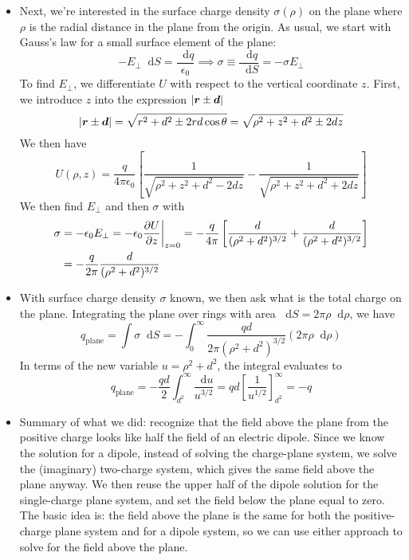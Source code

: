 \documentclass[11pt, a4paper]{article}
\newcommand{\diff}{\mathop{}\!\mathrm{d}} %
\renewcommand{\vec}[1]{\bm{#1}} %
\renewcommand{\r}{\vec{r}}
\newcommand{\ee}{\epsilon_{0}}  %
\begin{document}
\begin{itemize}
	\item Next, we're interested in the surface charge density $ \sigma(\rho) $ on the plane where $ \rho $ is the radial distance in the plane from the origin. As usual, we start with Gauss's law for a small surface element of the plane: 
	\begin{equation*}
		-E_{\perp}\diff S = \frac{\diff q}{\ee} \implies \sigma \equiv \frac{\diff q}{\diff S} =  -\sigma E_{\perp}
	\end{equation*}
	To find $ E_{\perp} $, we differentiate $ U $ with respect to the vertical coordinate $ z $. First, we introduce $ z $ into the expression $ \abs{\r \pm \vec{d}} $
	\begin{equation*}
		\abs{\r \pm \vec{d}} = \sqrt{r^{2}+d^{2} \pm 2rd\cos \theta} = \sqrt{\rho^{2} + z^{2} + d^{2} \pm 2dz}
	\end{equation*}
	We then have
	\begin{equation*}
		U(\rho, z) = \frac{q}{4\pi \ee}\left[\frac{1}{\sqrt{\rho^{2} + z^{2} + d^{2} - 2dz}} - \frac{1}{\sqrt{\rho^{2} + z^{2} + d^{2} + 2dz}}\right]
	\end{equation*}
	We then find $ E_{\perp} $ and then $ \sigma $ with
	\begin{align*}
		\sigma &= - \ee E_{\perp} = -\ee \pdv{U}{z}\bigg|_{z=0} = -\frac{q}{4\pi}\left[\frac{d}{(\rho^{2}+d^{2})^{3/2}} +  \frac{d}{(\rho^{2}+d^{2})^{3/2}} \right]\\
		& = -\frac{q}{2\pi} \frac{d}{(\rho^{2}+d^{2})^{3/2}}
	\end{align*}
	
	\item With surface charge density $ \sigma $ known, we then ask what is the total charge on the plane. Integrating the plane over rings with area $ \diff S = 2\pi \rho \diff \rho $, we have
	\begin{equation*}
		q_{\text{plane}} = \int \sigma \diff S = - \int_{0}^{\infty} \frac{qd}{2\pi(\rho^{2}+d^{2})^{3/2}} (2\pi \rho \diff \rho)
	\end{equation*}
	In terms of the new variable $ u = \rho^{2} + d^{2} $, the integral evaluates to
	\begin{equation*}
		q_{\text{plane}} = -\frac{qd}{2}\int_{d^{2}}^{\infty}\frac{\diff u}{u^{3/2}} = qd \left[\frac{1}{u^{1/2}}\right]_{d^{2}}^{\infty} = -q
	\end{equation*}
	
	\item Summary of what we did: recognize that the field above the plane from the positive charge looks like half the field of an electric dipole. Since we know the solution for a dipole, instead of solving the charge-plane system, we solve the (imaginary) two-charge system, which gives the same field above the plane anyway. We then reuse the upper half of the dipole solution for the single-charge plane system, and set the field below the plane equal to zero. The basic idea is: the field above the plane is the same for both the positive-charge plane system and for a dipole system, so we can use either approach to solve for the field above the plane. 
	

\end{itemize}
\end{document}
